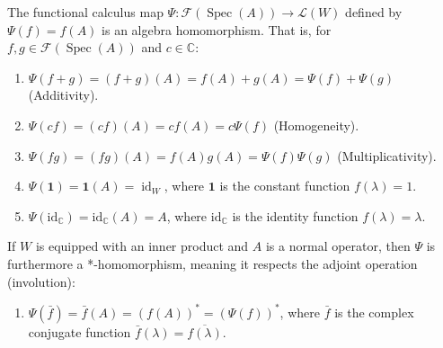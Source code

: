 \begin{theorem}
\label{thm:func_calc_props}
The functional calculus map $\Psi: \mathcal{F}(\operatorname{Spec}(A)) \to \mathcal{L}(W)$ defined by $\Psi(f) = f(A)$ is an algebra homomorphism. That is, for $f, g \in \mathcal{F}(\operatorname{Spec}(A))$ and $c \in \mathbb{C}$:
\begin{enumerate}
    \item $\Psi(f+g) = (f+g)(A) = f(A) + g(A) = \Psi(f) + \Psi(g)$ (Additivity).
    \item $\Psi(cf) = (cf)(A) = c f(A) = c \Psi(f)$ (Homogeneity).
    \item $\Psi(fg) = (fg)(A) = f(A) g(A) = \Psi(f) \Psi(g)$ (Multiplicativity).
    \item $\Psi(\mathbf{1}) = \mathbf{1}(A) = \operatorname{id}_W$, where $\mathbf{1}$ is the constant function $f(\lambda)=1$.
    \item $\Psi(\mathrm{id}_{\mathbb{C}}) = \mathrm{id}_{\mathbb{C}}(A) = A$, where $\mathrm{id}_{\mathbb{C}}$ is the identity function $f(\lambda)=\lambda$.
\end{enumerate}
If $W$ is equipped with an inner product and $A$ is a normal operator, then $\Psi$ is furthermore a *-homomorphism, meaning it respects the adjoint operation (involution):
\begin{enumerate}
    \item[6.] $\Psi(\bar{f}) = \bar{f}(A) = (f(A))^* = (\Psi(f))^*$, where $\bar{f}$ is the complex conjugate function $\bar{f}(\lambda) = \overline{f(\lambda)}$.
\end{enumerate}
\end{theorem}
